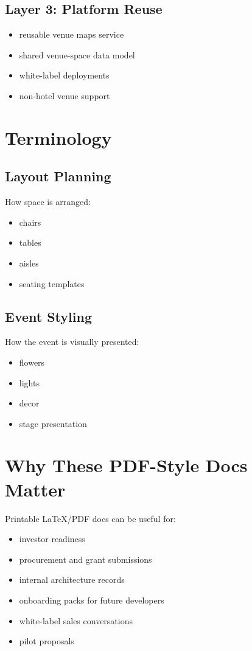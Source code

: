 \documentclass[11pt,a4paper]{article}
\begin{document}
\subsection{Layer 3: Platform Reuse}
\begin{itemize}
    \item reusable venue maps service
    \item shared venue-space data model
    \item white-label deployments
    \item non-hotel venue support
\end{itemize}

\section{Terminology}

\subsection{Layout Planning}

How space is arranged:
\begin{itemize}
    \item chairs
    \item tables
    \item aisles
    \item seating templates
\end{itemize}

\subsection{Event Styling}

How the event is visually presented:
\begin{itemize}
    \item flowers
    \item lights
    \item decor
    \item stage presentation
\end{itemize}

\section{Why These PDF-Style Docs Matter}

Printable LaTeX/PDF docs can be useful for:
\begin{itemize}
    \item investor readiness
    \item procurement and grant submissions
    \item internal architecture records
    \item onboarding packs for future developers
    \item white-label sales conversations
    \item pilot proposals
\end{itemize}
\end{document}
